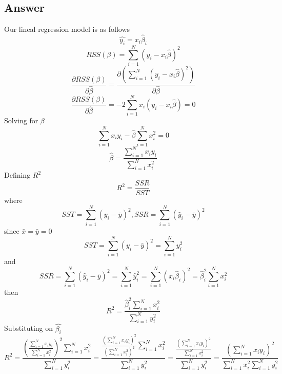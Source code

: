 \documentclass[conference, onecolumn]{IEEEtran}
\begin{document}
	\subsection*{Answer}
	Our lineal regression model is as follows
	\begin{equation}
		\hat{y_i} = x_i\hat{\beta}_i
	\end{equation}
	\begin{equation}
		RSS(\beta) = \sum_{i=1}^{N} \left( y_i - x_{i} \hat{\beta} \right)^2
	\end{equation}
	\begin{equation}
		\frac{\partial RSS(\beta)}{\partial \hat{\beta}} = \frac{\partial (\sum_{i=1}^{N} (y_i - x_i \hat{\beta})^2)}{\partial \hat{\beta}}
	\end{equation}
	\begin{equation}
		\frac{\partial RSS(\beta)}{\partial \hat{\beta}} = -2 \sum_{i=1}^{N} x_i (y_i - x_i \hat{\beta}) = 0
	\end{equation}
	Solving for $\beta$
	\begin{equation}
		\sum_{i=1}^{N} x_i y_i - \hat{\beta} \sum_{i=1}^{N} x_i^2 = 0
	\end{equation}
	\begin{equation}
		\hat{\beta} = \frac{\sum_{i=1}^{N} x_i y_i}{\sum_{i=1}^{N} x_i^2}
	\end{equation}
	Defining $R^2$
	\begin{equation}
		R^2 = \frac{SSR}{SST}
	\end{equation}
	where
	\begin{equation}
		SST = \sum_{i=1}^{N} (y_i - \bar{y})^2, SSR = \sum_{i=1}^{N} (\hat{y}_i - \bar{y})^2
	\end{equation}
	since $\bar{x} = \bar{y} = 0$
	\begin{equation}
		SST = \sum_{i=1}^{N} (y_i - \bar{y})^2 = \sum_{i=1}^{N} y_i^2
	\end{equation}
	and
	\begin{equation}
		SSR = \sum_{i=1}^{N} (\hat{y}_i - \bar{y})^2 = \sum_{i=1}^{N} \hat{y}_i^2 = \sum_{i=1}^{N} (x_i \hat{\beta}_i)^2 = \hat{\beta}_i^2 \sum_{i=1}^{N} x_i^2
	\end{equation}
	then
	\begin{equation}
		R^2 = \frac{\hat{\beta}_i^2 \sum_{i=1}^{N} x_i^2}{\sum_{i=1}^{N} y_i^2}
	\end{equation}
	Substituting on $\hat{\beta_i}$
	\begin{equation}
		R^2 = \frac{(\frac{\sum_{i=1}^{N} x_i y_i}{\sum_{i=1}^{N} x_i^2})^2 \sum_{i=1}^{N} x_i^2}{\sum_{i=1}^{N} y_i^2} = \frac{\frac{(\sum_{i=1}^{N} x_i y_i)^2}{(\sum_{i=1}^{N} x_i^2)^2} \sum_{i=1}^{N} x_i^2}{\sum_{i=1}^{N} y_i^2} = \frac{\frac{(\sum_{i=1}^{N} x_i y_i)^2}{\sum_{i=1}^{N} x_i^2}}{\sum_{i=1}^{N} y_i^2} = \frac{(\sum_{i=1}^{N} x_i y_i)^2}{\sum_{i=1}^{N} x_i^2 \sum_{i=1}^{N} y_i^2}
	\end{equation}
\end{document}
